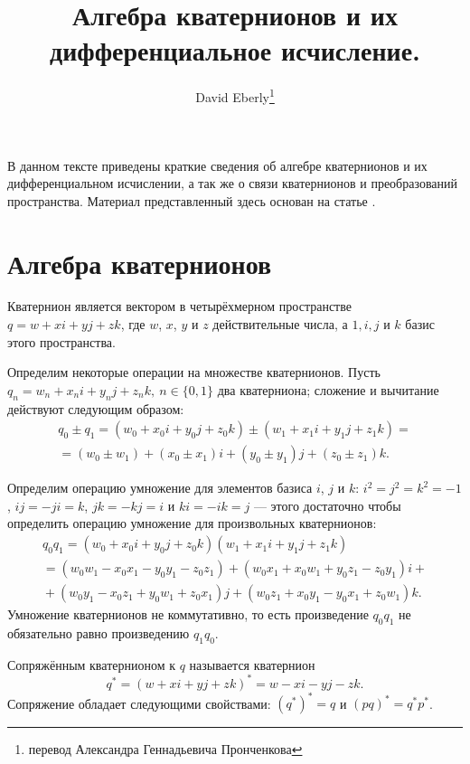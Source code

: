 \documentclass[draft]{article}
\begin{document}
\title{Алгебра кватернионов и их дифференциальное исчисление.}
\author{David Eberly\footnote{перевод Александра Геннадьевича Пронченкова}}
\maketitle

В данном тексте приведены краткие сведения об алгебре кватернионов и их дифференциальном исчислении, а так же о связи кватернионов и преобразований пространства. Материал представленный здесь основан на статье \cite{KenShoemake}.

\section{Алгебра кватернионов}

Кватернион является вектором
в четырёхмерном пространстве $q = w + x i + y j + z k$, где $w$, $x$, $y$ и $z$ действительные числа, а $1, i, j$ и $k$ базис этого пространства. 

Определим некоторые операции на множестве кватернионов. Пусть $q_n = w_n + x_n i + y_n j + z_n k,\ n \in \{0, 1\}$ два кватерниона; сложение и вычитание действуют следующим образом: 
\begin{multline}
\label{eq:1}
q_0 \pm q_1 = (w_0 + x_0 i + y_0 j + z_0 k) \pm (w_1 + x_1 i + y_1 j  +z_1 k) = {} \\
{} = (w_0 \pm w_1) + (x_0 \pm x_1) i + (y_0 \pm y_1) j + (z_0 \pm z_1) k .
\end{multline}

Определим операцию умножение для элементов базиса $i$, $j$ и $k$: $i^2 = j^2 = k^2 = -1$, $i j = -j i = k$, $j k = - k j = i$ и $k i = - i k = j$ — этого достаточно чтобы определить операцию умножение для произвольных кватернионов:
\begin{multline}
\label{eq:2}
q_0 q_1 = (w_0 + x_0 i + y_0 j + z_0 k)(w_1 + x_1 i + y_1 j + z_1 k) \\
= (w_0 w_1 - x_0 x_1 - y_0 y_1 - z_0 z_1) + (w_0 x_1 + x_0 w_1 + y_0 z_1 - z_0 y_1) i + {} \\
{} + (w_0 y_1 - x_0 z_1 + y_0 w_1 + z_0 x_1) j + (w_0 z_1 + x_0 y_1 - y_0 x_1 + z_0 w_1) k .
\end{multline}
Умножение кватернионов не коммутативно, то есть произведение $q_0 q_1$ не обязательно равно произведению $q_1 q_0$.

Сопряжённым кватернионом к $q$ называется кватернион
\begin{equation}
\label{eq:3}
q^* = (w + x i + y j + z k)^* = w - x i - y j - z k .
\end{equation}
Сопряжение обладает следующими свойствами: $(q^*)^* = q$ и $(p q)^* = q^* p^*$.
\end{document}
